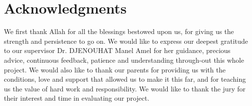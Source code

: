 \chapter*{Acknowledgments}

We first thank Allah for all the blessings bestowed upon us, for giving us the strength and persistence to go on. We would like to express our deepest gratitude to our supervisor Dr. DJENOUHAT Manel Amel for her guidance, precious advice, continuous feedback, patience and understanding through-out this whole project. We would also like to thank our parents for providing us with the conditions, love and support that allowed us to make it this far, and for teaching us the value of hard work and responsibility. We would like to thank the jury for their interest and time in evaluating our project.